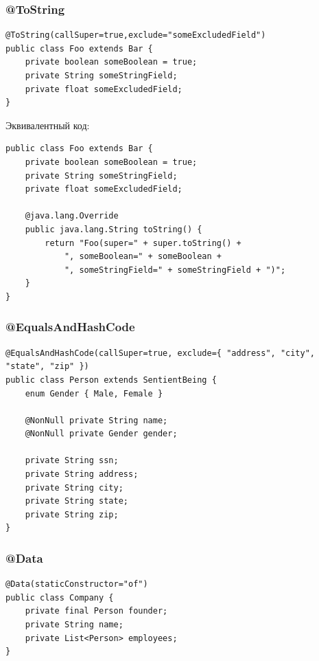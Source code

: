 \documentclass[xetex,mathserif,serif]{beamer}
\begin{document}
	\begin{frame}[fragile]
		\frametitle{@ToString}
		\begin{footnotesize}
			\begin{verbatim}
@ToString(callSuper=true,exclude="someExcludedField")
public class Foo extends Bar {
    private boolean someBoolean = true;
    private String someStringField;
    private float someExcludedField;
}
		\end{verbatim}
		Эквивалентный код:
		\begin{verbatim}
public class Foo extends Bar {
    private boolean someBoolean = true;
    private String someStringField;
    private float someExcludedField;
    
    @java.lang.Override
    public java.lang.String toString() {
        return "Foo(super=" + super.toString() +
            ", someBoolean=" + someBoolean +
            ", someStringField=" + someStringField + ")";
    }
}
			\end{verbatim}
		\end{footnotesize}
\end{frame}

	\begin{frame}[fragile]
		\frametitle{@EqualsAndHashCode}
		\begin{footnotesize}
			\begin{verbatim}
@EqualsAndHashCode(callSuper=true, exclude={ "address", "city", "state", "zip" })
public class Person extends SentientBeing {
    enum Gender { Male, Female }

    @NonNull private String name;
    @NonNull private Gender gender;
    
    private String ssn;
    private String address;
    private String city;
    private String state;
    private String zip;
}
			\end{verbatim}
		\end{footnotesize}
\end{frame}

	\begin{frame}[fragile]
		\frametitle{@Data}
		\begin{verbatim}
@Data(staticConstructor="of")
public class Company {
    private final Person founder;
    private String name;
    private List<Person> employees;
}
		\end{verbatim}
\end{frame}
\end{document}
